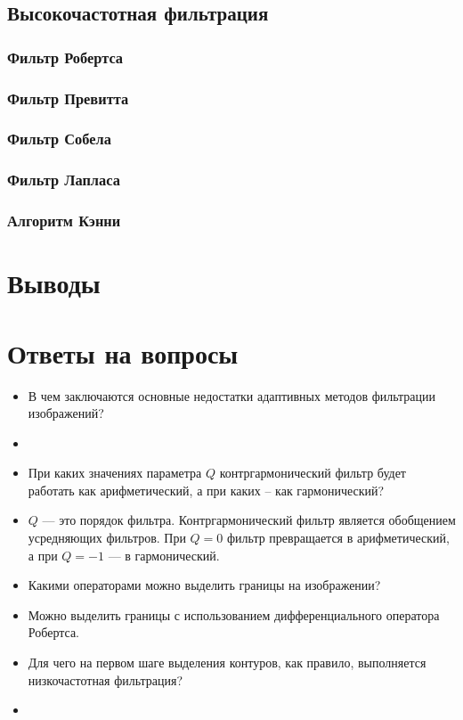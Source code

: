 \subsection{Высокочастотная фильтрация}
\subsubsection{Фильтр Робертса}
\newpage
\subsubsection{Фильтр Превитта}
\subsubsection{Фильтр Собела}
\subsubsection{Фильтр Лапласа}
\subsubsection{Алгоритм Кэнни}
\section{Выводы}

\section{Ответы на вопросы}

\setcounter{question}{0}

\newcommand{\question}[1]{\item[Q\refstepcounter{question}\thequestion.] #1}
\newcommand{\answer}[1]{\item[A\thequestion.] #1}

\begin{itemize}

\question{В чем заключаются основные недостатки адаптивных методов фильтрации изображений?}
\answer{}

\question{При каких значениях параметра $Q$ контргармонический фильтр будет работать как арифметический, а при каких -- как гармонический?}
\answer{$Q$ — это порядок фильтра. Контргармонический фильтр является обобщением усредняющих фильтров. При $Q = 0$ фильтр превращается в арифметический, а при $Q = -1$ — в гармонический.}

\question{Какими операторами можно выделить границы на изображении?}
\answer{Можно выделить границы с использованием дифференциального оператора
Робертса.}

\question{Для чего на первом шаге выделения контуров, как правило, выполняется низкочастотная фильтрация?}
\answer{}

\end{itemize}
